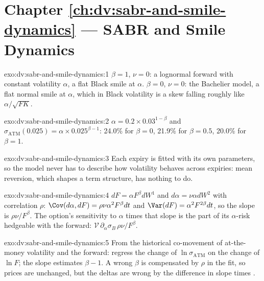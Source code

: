 \section*{Chapter \ref{ch:dv:sabr-and-smile-dynamics} --- SABR and Smile Dynamics}

\begin{solution}{exo:dv:sabr-and-smile-dynamics:1}
$\beta=1$, $\nu=0$: a lognormal forward with constant volatility $\alpha$, a flat Black smile at $\alpha$. $\beta=0$,
$\nu=0$: the Bachelier model, a flat normal smile at $\alpha$, which in Black volatility is a skew falling roughly like
$\alpha/\sqrt{FK}$.
\end{solution}

\begin{solution}{exo:dv:sabr-and-smile-dynamics:2}
$\alpha=0.2\times0.03^{1-\beta}$ and $\sigma_{\mathrm{ATM}}(0.025)=\alpha\times0.025^{\beta-1}$: 24.0\% for $\beta=0$,
21.9\% for $\beta=0.5$, 20.0\% for $\beta=1$.
\end{solution}

\begin{solution}{exo:dv:sabr-and-smile-dynamics:3}
Each expiry is fitted with its own parameters, so the model never has to describe how volatility behaves across
expiries: mean reversion, which shapes a term structure, has nothing to do.
\end{solution}

\begin{solution}{exo:dv:sabr-and-smile-dynamics:4}
$dF=\alpha F^\beta dW^1$ and $d\alpha=\nu\alpha dW^2$ with correlation $\rho$: $\Cov(d\alpha,dF)=\rho\nu\alpha^2F^\beta dt$
and $\Var(dF)=\alpha^2F^{2\beta}dt$, so the slope is $\rho\nu/F^\beta$. The option's sensitivity to $\alpha$ times that slope
is the part of its $\alpha$-risk hedgeable with the forward: $\mathcal V\,\partial_\alpha\sigma_B\,\rho\nu/F^\beta$.
\end{solution}

\begin{solution}{exo:dv:sabr-and-smile-dynamics:5}
From the historical co-movement of at-the-money volatility and the forward: regress the change of $\ln\sigma_{\mathrm{ATM}}$
on the change of $\ln F$; the slope estimates $\beta-1$. A wrong $\beta$ is compensated by $\rho$ in the fit, so prices are
unchanged, but the deltas are wrong by the difference in  slope times .
\end{solution}

